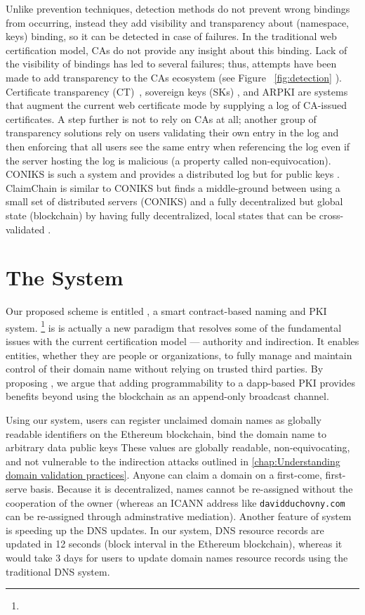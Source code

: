 Unlike prevention techniques, detection methods do not prevent wrong bindings from occurring, instead they add visibility and transparency about (namespace, keys) binding, so it can be detected in case of failures. In the traditional web certification model, CAs do not provide any insight about this binding. Lack of the visibility of bindings has led to several failures; thus, attempts have been made to add transparency to the CAs ecosystem (see Figure ~\ref{fig:detection} ). Certificate transparency (CT)~\cite{laurie2014certificate}, sovereign keys (SKs) \cite{giteffor4:online}, and ARPKI \cite{basin2014arpki} are systems that augment the current web certificate mode by supplying a log of CA-issued certificates. A step further is not to rely on CAs at all; another group of transparency solutions rely on users validating their own entry in the log and then enforcing that all users see the same entry when referencing the log even if the server hosting the log is malicious (a property called non-equivocation). CONIKS is such a system and provides a distributed log but for public keys \cite{melara2015coniks}. ClaimChain is similar to CONIKS but finds a middle-ground between using a small set of distributed servers (CONIKS) and a fully decentralized but global state (blockchain) by having fully decentralized, local states that can be cross-validated \cite{kulynych2017claimchain}.

\section{The \Ghazalstar System}

Our proposed scheme is entitled \Ghazalstar, a smart contract-based naming and PKI \UA system. \footnote{\GhazalCode} \Ghazalstar is is actually a new \UA paradigm that resolves some of the fundamental issues with the current certification model --- authority and indirection. It enables entities, whether they are people or organizations, to fully manage and maintain control of their domain name without relying on trusted third parties. By proposing \Ghazalstar, we argue that adding programmability to a dapp-based PKI provides benefits beyond using the blockchain as an append-only broadcast channel.

Using our system, users can register unclaimed domain names as globally readable identifiers on the Ethereum blockchain, bind the domain name to arbitrary data \ie public keys \etc These values are globally readable, non-equivocating, and not vulnerable to the indirection attacks outlined in \autoref{chap:Understanding domain validation practices}. Anyone can claim a domain on a first-come, first-serve basis. Because it is decentralized, names cannot be re-assigned without the cooperation of the owner (whereas an ICANN address like \texttt{davidduchovny.com} can be re-assigned through adminstrative mediation). Another feature of \Ghazalstar system is speeding up the DNS updates. In our system, DNS resource records are updated in 12 seconds (block interval in the Ethereum blockchain), whereas it would take 3 days for users to update domain names resource records using the traditional DNS system.

